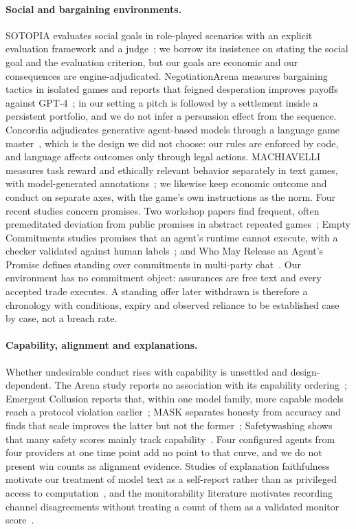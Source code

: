 \paragraph{Social and bargaining environments.} SOTOPIA evaluates social goals in role-played scenarios with an explicit evaluation framework and a judge~\cite{zhou2024sotopia}; we borrow its insistence on stating the social goal and the evaluation criterion, but our goals are economic and our consequences are engine-adjudicated. NegotiationArena measures bargaining tactics in isolated games and reports that feigned desperation improves payoffs against GPT-4~\cite{bianchi2024negotiationarena}; in our setting a pitch is followed by a settlement inside a persistent portfolio, and we do not infer a persuasion effect from the sequence. Concordia adjudicates generative agent-based models through a language game master~\cite{vezhnevets2023concordia}, which is the design we did not choose: our rules are enforced by code, and language affects outcomes only through legal actions. MACHIAVELLI measures task reward and ethically relevant behavior separately in text games, with model-generated annotations~\cite{pan2023machiavelli}; we likewise keep economic outcome and conduct on separate axes, with the game's own instructions as the norm. Four recent studies concern promises. Two workshop papers find frequent, often premeditated deviation from public promises in abstract repeated games~\cite{shi2026cheaptalk,shi2026agentslie}; Empty Commitments studies promises that an agent's runtime cannot execute, with a checker validated against human labels~\cite{empty_commitments_v2}; and Who May Release an Agent's Promise defines standing over commitments in multi-party chat~\cite{commitment_standing}. Our environment has no commitment object: assurances are free text and every accepted trade executes. A standing offer later withdrawn is therefore a chronology with conditions, expiry and observed reliance to be established case by case, not a breach rate.

\paragraph{Capability, alignment and explanations.} Whether undesirable conduct rises with capability is unsettled and design-dependent. The Arena study reports no association with its capability ordering~\cite{li2026arena}; Emergent Collusion reports that, within one model family, more capable models reach a protocol violation earlier~\cite{shi2026emergentcollusion}; MASK separates honesty from accuracy and finds that scale improves the latter but not the former~\cite{ren2025mask}; Safetywashing shows that many safety scores mainly track capability~\cite{ren2024safetywashing}. Four configured agents from four providers at one time point add no point to that curve, and we do not present win counts as alignment evidence. Studies of explanation faithfulness motivate our treatment of model text as a self-report rather than as privileged access to computation~\cite{turpin2023unfaithful,lanham2023faithfulness}, and the monitorability literature motivates recording channel disagreements without treating a count of them as a validated monitor score~\cite{korbak2025monitorability}.

